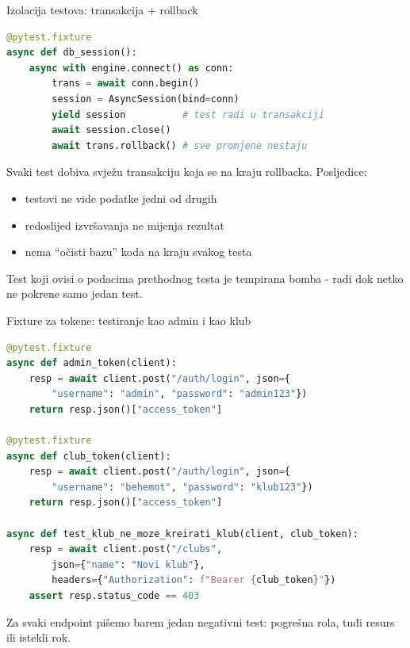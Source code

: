 \begin{frame}[fragile,shrink=5]{Izolacija testova: transakcija + rollback}
\begin{lstlisting}[language=python]
@pytest.fixture
async def db_session():
    async with engine.connect() as conn:
        trans = await conn.begin()
        session = AsyncSession(bind=conn)
        yield session          # test radi u transakciji
        await session.close()
        await trans.rollback() # sve promjene nestaju
\end{lstlisting}

\vspace{0.4em}
Svaki test dobiva svježu transakciju koja se na kraju rollbacka. Posljedice:
\begin{itemize}
  \item testovi ne vide podatke jedni od drugih
  \item redoslijed izvršavanja ne mijenja rezultat
  \item nema \enquote{očisti bazu} koda na kraju svakog testa
\end{itemize}

\vspace{0.4em}
Test koji ovisi o podacima prethodnog testa je tempirana bomba - radi dok netko ne pokrene samo jedan test.
\end{frame}

\begin{frame}[fragile,shrink=5]{Fixture za tokene: testiranje kao admin i kao klub}
\begin{lstlisting}[language=python]
@pytest.fixture
async def admin_token(client):
    resp = await client.post("/auth/login", json={
        "username": "admin", "password": "admin123"})
    return resp.json()["access_token"]

@pytest.fixture
async def club_token(client):
    resp = await client.post("/auth/login", json={
        "username": "behemot", "password": "klub123"})
    return resp.json()["access_token"]

async def test_klub_ne_moze_kreirati_klub(client, club_token):
    resp = await client.post("/clubs",
        json={"name": "Novi klub"},
        headers={"Authorization": f"Bearer {club_token}"})
    assert resp.status_code == 403
\end{lstlisting}

\vspace{0.4em}
Za svaki endpoint pišemo barem jedan negativni test: pogrešna rola, tuđi resurs ili istekli rok.
\end{frame}

